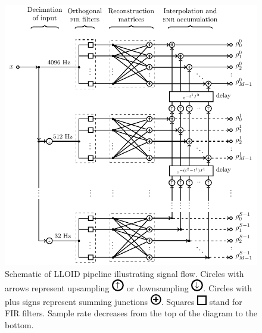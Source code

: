 \begin{figure}
	\includegraphics{figures/lloid-diagram.pdf}
	\caption{Schematic of LLOID pipeline illustrating signal flow.  Circles with arrows represent upsampling \protect\includegraphics{figures/upsample-symbol.pdf} or downsampling \protect\includegraphics{figures/downsample-symbol.pdf}.  Circles with plus signs represent summing junctions \protect\includegraphics{figures/adder-symbol.pdf}.  Squares \protect\includegraphics{figures/fir-symbol.pdf} stand for FIR filters.  Sample rate decreases from the top of the diagram to the bottom.}
\end{figure}

